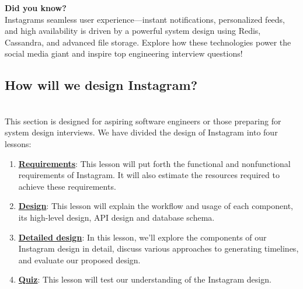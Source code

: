 \textbf{Did you know?}
\\
Instagram\textquotesingle s seamless user experience---instant notifications, personalized feeds, and high availability is driven by a powerful system design using Redis, Cassandra, and advanced file storage. Explore how these technologies power the social media giant and inspire top engineering interview questions!

\subsection{How will we design Instagram?}\label{5WDafaiehoFLE6a-neYQh}
\\
This section is designed for aspiring software engineers or those preparing for system design interviews. We have divided the design of Instagram into four lessons:

\begin{enumerate}
\item
\protect{}\label{sOTQcbKAD_xmOELebf2tO}
\href{https://www.educative.io/courses/grokking-the-system-design-interview/requirements-of-instagrams-design}{\textbf{Requirements}}: This lesson will put forth the functional and nonfunctional requirements of Instagram. It will also estimate the resources required to achieve these requirements.
\item
\protect{}\label{vk-PYuxnq8896Ob-CxuAs}
\href{https://www.educative.io/courses/grokking-the-system-design-interview/design-of-instagram}{\textbf{Design}}: This lesson will explain the workflow and usage of each component, its high-level design, API design and database schema.
\item
\protect{}\label{DAM3KoX3_EaJBtVHE30Lm}
\href{https://www.educative.io/courses/grokking-the-system-design-interview/detailed-design-of-instagram}{\textbf{Detailed design}}: In this lesson, we'll explore the components of our Instagram design in detail, discuss various approaches to generating timelines, and evaluate our proposed design.
\item
\protect{}\label{EgC5bJ0jq2eCEzzxlX79p}
\href{https://www.educative.io/courses/grokking-the-system-design-interview/quiz-on-instagrams-design}{\textbf{Quiz}}: This lesson will test our understanding of the Instagram design.
\end{enumerate}

